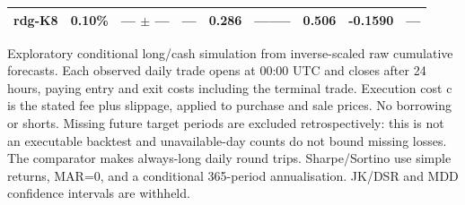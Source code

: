 \begin{table}[!t]
\begin{tabular}{llrrrrrrr}
rdg-K8 & 0.10\% & --- $\pm$ --- & --- & 0.286 & -------- & 0.506 & -0.1590 & --- \\
\bottomrule
\end{tabular}
\vspace{2pt}\par\footnotesize Exploratory conditional long/cash simulation from inverse-scaled raw cumulative forecasts. Each observed daily trade opens at 00:00 UTC and closes after 24 hours, paying entry and exit costs including the terminal trade. Execution cost c is the stated fee plus slippage, applied to purchase and sale prices. No borrowing or shorts. Missing future target periods are excluded retrospectively: this is not an executable backtest and unavailable-day counts do not bound missing losses. The comparator makes always-long daily round trips. Sharpe/Sortino use simple returns, MAR=0, and a conditional 365-period annualisation. JK/DSR and MDD confidence intervals are withheld.
\end{table}
